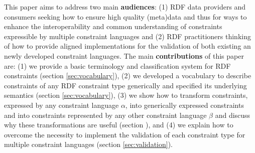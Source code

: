 \documentclass{llncs}
\newcommand{\ms}[1]{\texttt{#1}}
\begin{document}

This paper aims to address two main \textbf{audiences}:
(1) RDF data providers and consumers seeking how to ensure high quality (meta)data and thus for ways to enhance the interoperability and common understanding of constraints expressible by multiple constraint languages and  
(2) RDF practitioners thinking of how to provide aligned implementations for the validation of both existing an newly developed constraint languages.
The main \textbf{contributions} of this paper are:
(1) we provide a basic terminology and classification system for RDF constraints (section \ref{sec:vocabulary}),
(2) we developed a vocabulary to describe constraints of any RDF constraint type generically and specified its underlying semantics (section \ref{sec:vocabulary}),
(3) we show how to transform constraints, expressed by any constraint language \ms{$\alpha$}, into generically expressed constraints and into constraints represented by any other constraint language \ms{$\beta$} and discuss why these transformations are useful (section \label{ref:transformations}), and
(4) we explain how to overcome the necessity to implement the validation of each constraint type for multiple constraint languages (section \ref{sec:validation}).

\end{document}

